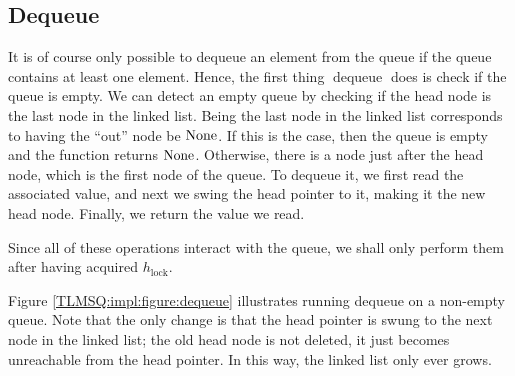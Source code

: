 \documentclass[a4paper, 10pt]{report}
\theoremstyle{definition}
\newcommand{\dequeue}{\operatorname{dequeue}}
\newcommand{\Hlock}{h_{\mathrm{lock}}}
\begin{document}
\subsection{Dequeue}
\label{TLMSQ:implementation:sub:dequeue}

It is of course only possible to dequeue an element from the queue if the queue contains at least one element. Hence, the first thing $\dequeue$ does is check if the queue is empty. We can detect an empty queue by checking if the head node is the last node in the linked list. Being the last node in the linked list corresponds to having the ``out'' node be $\operatorname{None}$. If this is the case, then the queue is empty and the function returns $\operatorname{None}$. Otherwise, there is a node just after the head node, which is the first node of the queue. To dequeue it, we first read the associated value, and next we swing the head pointer to it, making it the new head node. Finally, we return the value we read.

Since all of these operations interact with the queue, we shall only perform them after having acquired $\Hlock$.

Figure \ref{TLMSQ:impl:figure:dequeue} illustrates running dequeue on a non-empty queue. Note that the only change is that the head pointer is swung to the next node in the linked list; the old head node is not deleted, it just becomes unreachable from the head pointer. In this way, the linked list only ever grows.
\end{document}
